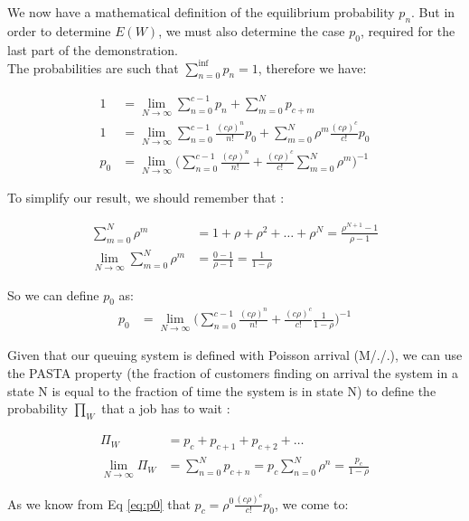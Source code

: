 \documentclass{article}
\begin{document}
    We now have a mathematical definition of the equilibrium probability $p_n$. But in order to determine $E(W)$, we must also determine the case $p_0$, required for the last part of the demonstration.\\
    The probabilities are such that $\sum_{n=0}^{\inf} p_n = 1$, therefore we have:

    \begin{align}
        1 &= \lim_{N\to\infty} \sum_{n=0}^{c - 1} p_n + \sum_{m=0}^{N} p_{c + m} \\
        1 &= \lim_{N\to\infty} \sum_{n=0}^{c - 1} \frac{(c \rho)^n}{n!} p_0 + \sum_{m=0}^{N} \rho^m \frac{(c \rho)^c}{c !} p_0  \\
        p_0 &= \lim_{N\to\infty} \Big( \sum_{n=0}^{c - 1} \frac{(c \rho)^n}{n!} + \frac{(c \rho)^c}{c !} \sum_{m=0}^{N} \rho^m \Big)^{-1}
    \end{align}

    To simplify our result, we should remember that :

    \begin{align}
        \sum_{m=0}^{N} \rho^m &= 1 + \rho + \rho^2 + \ldots + \rho^N = \frac{\rho^{N + 1} - 1}{\rho - 1} \\
        \lim_{N\to\infty} \sum_{m=0}^{N} \rho^m &= \frac{0 - 1}{\rho - 1} = \frac{1}{1 - \rho}
    \end{align}

    So we can define $p_0$ as:
    \begin{align}
        p_0 &= \lim_{N\to\infty} \Big( \sum_{n=0}^{c - 1} \frac{(c \rho)^n}{n!} + \frac{(c \rho)^c}{c !} \frac{1}{1 - \rho} \Big)^{-1}
        \label{eq:p0}
    \end{align}

    Given that our queuing system is defined with Poisson arrival (M/./.), we can use the PASTA property (the fraction of customers finding on arrival the system in a state N is equal to the fraction of time the system is in state N) to define the probability $\prod_W$ that a job has to wait :

    \begin{align}
        \Pi_W &= p_c + p_{c+1} + p_{c+2} + \ldots \\
        \lim_{N\to\infty} \Pi_W &= \sum_{n=0}^{N} p_{c + n} = p_c \sum_{n=0}^{N} \rho^n = \frac{p_c}{1 - \rho}
        \label{eq:pi_w}
    \end{align}

    As we know from Eq \ref{eq:p0} that $p_c = \rho^0 \frac{(c \rho)^c}{c!}p_0$, we come to:
\end{document}
